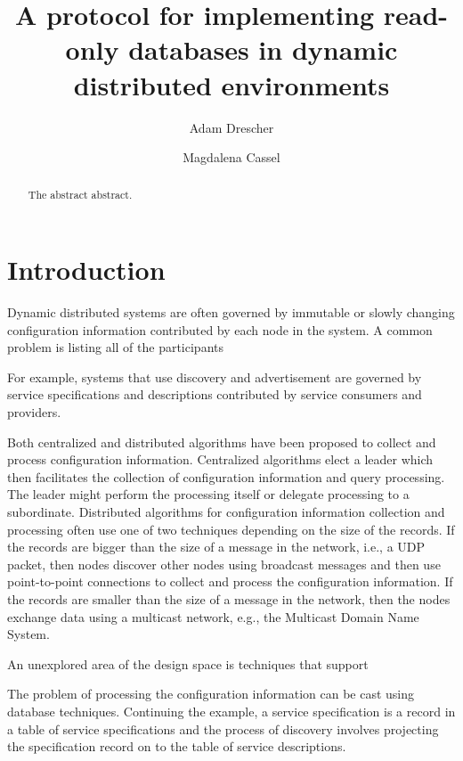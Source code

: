 \documentclass[letterpaper]{article}
\begin{document}
\title{A protocol for implementing read-only databases in dynamic distributed environments}
\author{Adam Drescher \and Magdalena Cassel}
\date{}

\maketitle

\begin{abstract}
The abstract abstract.
\end{abstract}

\section{Introduction}

Dynamic distributed systems are often governed by immutable or slowly changing configuration information contributed by each node in the system.
A common problem is listing all of the participants

For example, systems that use discovery and advertisement are governed by service specifications and descriptions contributed by service consumers and providers.

Both centralized and distributed algorithms have been proposed to collect and process configuration information.
Centralized algorithms elect a leader which then facilitates the collection of configuration information and query processing.
The leader might perform the processing itself or delegate processing to a subordinate.
Distributed algorithms for configuration information collection and processing often use one of two techniques depending on the size of the records.
If the records are bigger than the size of a message in the network, i.e., a UDP packet, then nodes discover other nodes using broadcast messages and then use point-to-point connections to collect and process the configuration information.
If the records are smaller than the size of a message in the network, then the nodes exchange data using a multicast network, e.g., the Multicast Domain Name System.

An unexplored area of the design space is techniques that support 

The problem of processing the configuration information can be cast using database techniques.
Continuing the example, a service specification is a record in a table of service specifications and the process of discovery involves projecting the specification record on to the table of service descriptions.
\end{document}
